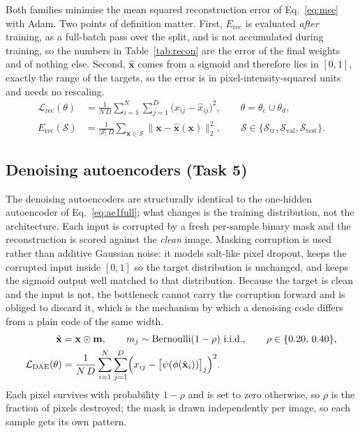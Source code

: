 \documentclass[11pt,a4paper]{article}
\begin{document}
Both families minimise the mean squared reconstruction error of Eq.~\eqref{eq:mse} with Adam.  Two
points of definition matter.  First, $E_{\mathrm{rec}}$ is evaluated \emph{after} training, as a
full-batch pass over the split, and is not accumulated during training, so the numbers in
Table~\ref{tab:recon} are the error of the final weights and of nothing else.  Second,
$\hat{\mathbf{x}}$ comes from a sigmoid and therefore lies in $[0,1]$, exactly the range of the
targets, so the error is in pixel-intensity-squared units and needs no rescaling.
\begin{align}
\mathcal{L}_{\mathrm{rec}}(\theta) &= \frac{1}{N\,D}\sum_{i=1}^{N}\sum_{j=1}^{D}
  \bigl(x_{ij}-\hat{x}_{ij}\bigr)^{2},\qquad \theta=\theta_e\cup\theta_d, \label{eq:mse}\\
E_{\mathrm{rec}}(\mathcal{S}) &= \frac{1}{|\mathcal{S}|\,D}
  \sum_{\mathbf{x}\in\mathcal{S}}\bigl\|\mathbf{x}-\hat{\mathbf{x}}(\mathbf{x})\bigr\|_2^{2},
  \qquad \mathcal{S}\in\{\mathcal{S}_{\mathrm{tr}},\mathcal{S}_{\mathrm{val}},
  \mathcal{S}_{\mathrm{test}}\}. \label{eq:recsplit}
\end{align}

\subsection{Denoising autoencoders (Task 5)}\label{sec:arch:dae}
The denoising autoencoders are structurally identical to the one-hidden autoencoder of
Eq.~\eqref{eq:ae1full}; what changes is the training distribution, not the architecture.  Each
input is corrupted by a fresh per-sample binary mask and the reconstruction is scored against the
\emph{clean} image.  Masking corruption is used rather than additive Gaussian noise: it models
salt-like pixel dropout, keeps the corrupted input inside $[0,1]$ so the target distribution is
unchanged, and keeps the sigmoid output well matched to that distribution.  Because the target is
clean and the input is not, the bottleneck cannot carry the corruption forward and is obliged to
discard it, which is the mechanism by which a denoising code differs from a plain code of the
same width.
\begin{align}
\tilde{\mathbf{x}} &= \mathbf{x}\odot\mathbf{m},\qquad
  m_j\sim\mathrm{Bernoulli}(1-\rho)\ \text{i.i.d.},\qquad \rho\in\{0.20,\,0.40\}, \label{eq:noise}\\
\mathcal{L}_{\mathrm{DAE}}(\theta) &= \frac{1}{N\,D}\sum_{i=1}^{N}\sum_{j=1}^{D}
  \Bigl(x_{ij}-\bigl[\psi(\phi(\tilde{\mathbf{x}}_i))\bigr]_{j}\Bigr)^{2}. \label{eq:dae}
\end{align}
Each pixel survives with probability $1-\rho$ and is set to zero otherwise, so $\rho$ is the
fraction of pixels destroyed; the mask is drawn independently per image, so each sample gets its
own pattern.
\end{document}
